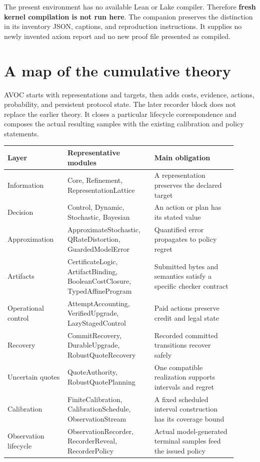 \documentclass[11pt]{article}
\begin{document}
The present environment has no available Lean or Lake compiler. Therefore
\textbf{fresh kernel compilation is not run here}. The companion preserves
the distinction in its inventory JSON, captions, and reproduction instructions.
It supplies no newly invented axiom report and no new proof file presented as
compiled.

\section{A map of the cumulative theory}
AVOC starts with representations and targets, then adds costs, evidence,
actions, probability, and persistent protocol state. The later recorder block
does not replace the earlier theory. It closes a particular lifecycle
correspondence and composes the actual resulting samples with the existing
calibration and policy statements.

\begin{center}
\begin{tabular}{p{0.24\linewidth}p{0.34\linewidth}p{0.33\linewidth}}
\toprule
Layer & Representative modules & Main obligation\\
\midrule
Information & Core, Refinement, RepresentationLattice & A representation preserves the declared target\\
Decision & Control, Dynamic, Stochastic, Bayesian & An action or plan has its stated value\\
Approximation & ApproximateStochastic, QRateDistortion, GuardedModelError & Quantified error propagates to policy regret\\
Artifacts & CertificateLogic, ArtifactBinding, BooleanCostClosure, TypedAffineProgram & Submitted bytes and semantics satisfy a specific checker contract\\
Operational control & AttemptAccounting, VerifiedUpgrade, LazyStagedControl & Paid actions preserve credit and legal state\\
Recovery & CommitRecovery, DurableUpgrade, RobustQuoteRecovery & Recorded committed transitions recover safely\\
Uncertain quotes & QuoteAuthority, RobustQuotePlanning & One compatible realization supports intervals and regret\\
Calibration & FiniteCalibration, CalibrationSchedule, ObservationStream & A fixed scheduled interval construction has its coverage bound\\
Observation lifecycle & ObservationRecorder, RecorderReveal, RecorderPolicy & Actual model-generated terminal samples feed the issued policy\\
\bottomrule
\end{tabular}
\end{center}
\end{document}

